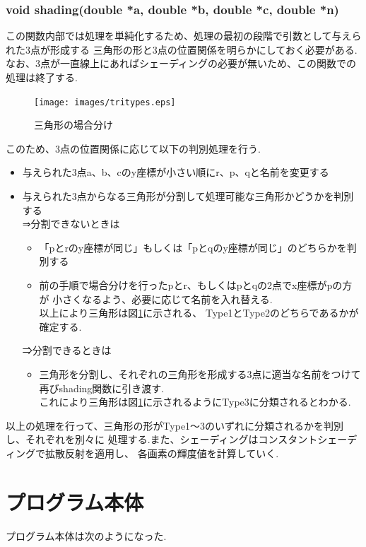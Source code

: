 \documentclass[a4j,dvipdfmx]{jsarticle}
\begin{document}
\subsubsection{void shading(double *a, double *b, double *c, double *n)}
この関数内部では処理を単純化するため、処理の最初の段階で引数として与えられた3点が形成する
三角形の形と3点の位置関係を明らかにしておく必要がある.
なお、3点が一直線上にあればシェーディングの必要が無いため、この関数での処理は終了する.
\begin{figure}[b]
  \begin{center}
        \texttt{[image: images/tritypes.eps]}
        \caption{三角形の場合分け}
        \label{fig:tritypes}
  \end{center}
\end{figure}
このため、3点の位置関係に応じて以下の判別処理を行う.
\begin{itemize}
\item 与えられた3点a、b、cのy座標が小さい順にr、p、qと名前を変更する
\item 与えられた3点からなる三角形が分割して処理可能な三角形かどうかを判別する\\
  
  ⇒分割できないときは
  \begin{itemize}
  \item 「pとrのy座標が同じ」もしくは「pとqのy座標が同じ」のどちらかを判別する\\
  \item 前の手順で場合分けを行ったpとr、もしくはpとqの2点でx座標がpの方が
    小さくなるよう、必要に応じて名前を入れ替える.\\
    以上により三角形は図\ref{fig:tritypes}に示される、
    Type1とType2のどちらであるかが確定する.
  \end{itemize}
  
  ⇒分割できるときは
  \begin{itemize}
  \item 三角形を分割し、それぞれの三角形を形成する3点に適当な名前をつけて
    再びshading関数に引き渡す.\\
    これにより三角形は図\ref{fig:tritypes}に示されるようにType3に分類されるとわかる.
  \end{itemize}
\end{itemize}
以上の処理を行って、三角形の形がType1〜3のいずれに分類されるかを判別し、それぞれを別々に
処理する.また、シェーディングはコンスタントシェーディングで拡散反射を適用し、
各画素の輝度値を計算していく.


\section{プログラム本体}
プログラム本体は次のようになった.

\end{document}
